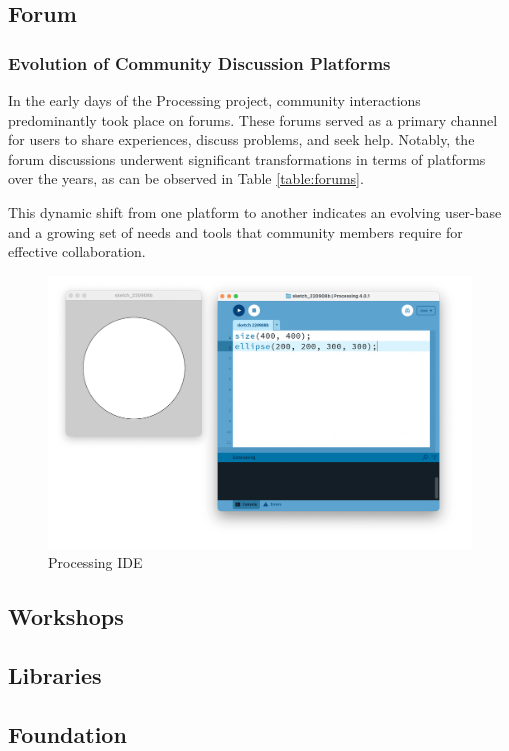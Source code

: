 \subsection{Forum}

\subsubsection*{Evolution of Community Discussion Platforms}
In the early days of the Processing project, community interactions predominantly took place on forums. These forums served as a primary channel for users to share experiences, discuss problems, and seek help. Notably, the forum discussions underwent significant transformations in terms of platforms over the years, as can be observed in Table \ref{table:forums}. \parencite{ProcessingForum}



This dynamic shift from one platform to another indicates an evolving user-base and a growing set of needs and tools that community members require for effective collaboration.

\begin{figure}
    \includegraphics[width=1\textwidth]{images/processing_ide.png} 
    \caption{Processing IDE \parencite{reasProcessingIDE2015}}
    \label{fig:processing_ide_screenshot}
  \end{figure}
  

\subsection{Workshops}
\subsection{Libraries}
\subsection{Foundation}
